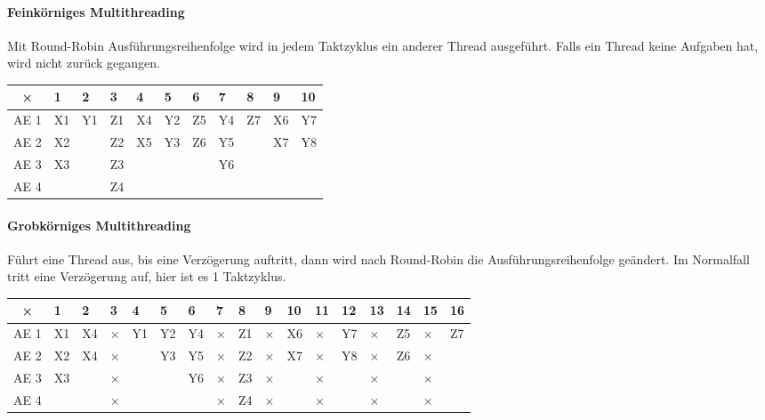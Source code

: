 \paragraph{Feinkörniges Multithreading} Mit Round-Robin Ausführungsreihenfolge wird in jedem
Taktzyklus ein anderer Thread ausgeführt. Falls ein Thread keine Aufgaben hat, wird nicht
zurück gegangen.\par
\begingroup\setlength\tabcolsep{2pt}
\begin{tabular}{|c|llllllllll|}\hline
  ×  & 1 & 2 & 3 & 4 & 5 & 6 & 7 & 8 & 9 & 10\\\hline
AE 1 & X1 & Y1 & Z1 & X4 & Y2 & Z5 & Y4 & Z7 & X6 & Y7\\
AE 2 & X2 &    & Z2 & X5 & Y3 & Z6 & Y5 &    & X7 & Y8\\
AE 3 & X3 &    & Z3 &    &    &    & Y6 &    &    &   \\
AE 4 &    &    & Z4 &    &    &    &    &    &    &   \\\hline
\end{tabular}
\endgroup

\paragraph{Grobkörniges Multithreading} Führt eine Thread aus, bis eine Verzögerung auftritt, dann
wird nach Round-Robin die Ausführungsreihenfolge geändert. Im Normalfall tritt eine Verzögerung auf,
hier ist es 1 Taktzyklus.\par
\begingroup\setlength\tabcolsep{2pt}
\begin{tabular}{|c|llllllllllllllll|}\hline
  ×  & 1 & 2 & 3 & 4 & 5 & 6 & 7 & 8 & 9 & 10 & 11 & 12 & 13 & 14 & 15 & 16 \\\hline
AE 1 & X1 & X4 & × & Y1 & Y2 & Y4 & × & Z1 & × & X6 & × & Y7 & × & Z5 & × & Z7 \\
AE 2 & X2 & X4 & × &    & Y3 & Y5 & × & Z2 & × & X7 & × & Y8 & × & Z6 & × &    \\
AE 3 & X3 &    & × &    &    & Y6 & × & Z3 & × &    & × &    & × &    & × &    \\
AE 4 &    &    & × &    &    &    & × & Z4 & × &    & × &    & × &    & × &    \\\hline
\end{tabular}
\endgroup

